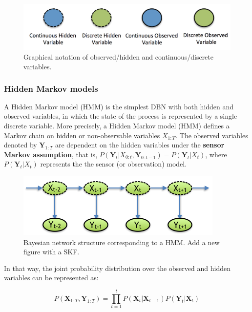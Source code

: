 \begin{figure}
\begin{center}
\includegraphics[scale=0.4]{./figures/PreliminariesNotation}
\caption{\label{Figure:PreliminariesNotation}Graphical notation of observed/hidden and continuous/discrete variables.
}
\end{center}
\end{figure}


\subsubsection{Hidden Markov models}
A Hidden Markov model (HMM) is the simplest DBN with both hidden and observed variables, in which the state of the process is represented by a single discrete variable. More precisely, a Hidden Markov model (HMM) defines a Markov chain on hidden or non-observable variables $X_{1:T}$. The observed variables denoted by $\bm Y_{1:T}$ are dependent on the hidden variables under the \textbf{sensor Markov assumption}, that is, $P(\bm Y_t| X_{0:t}, \bm Y_{0:t-1}) = P(\bm Y_t| X_t)$, where $P(\bm Y_t| X_t)$ represents the the sensor (or observation) model.  

\begin{figure}[ht!]
\begin{center}
\includegraphics[scale=0.56]{./figures/PreliminariesHMM}
\caption{\label{Figure:HMM}Bayesian network structure corresponding to a HMM. {\color{red} Add a new figure with a SKF.}}
\end{center}
\end{figure}


In that way, the joint probability distribution over the observed and hidden variables can be represented as:

\begin{equation}
P(\bm X_{1:T},\bm Y_{1:T}) = \prod_{t=1}^t{P(\bm X_t| \bm X_{t-1})P(\bm Y_t|\bm X_t)}
\end{equation}

